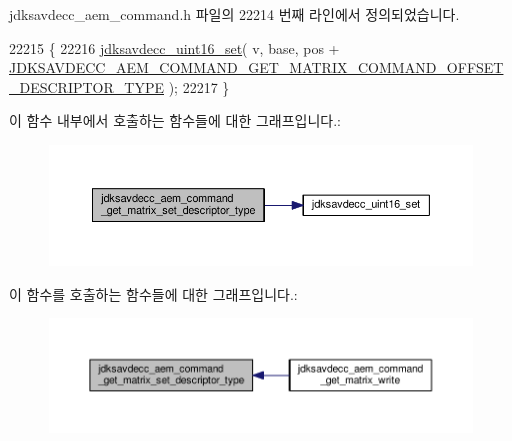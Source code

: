 jdksavdecc\+\_\+aem\+\_\+command.\+h 파일의 22214 번째 라인에서 정의되었습니다.


\begin{DoxyCode}
22215 \{
22216     \hyperlink{group__endian_ga14b9eeadc05f94334096c127c955a60b}{jdksavdecc\_uint16\_set}( v, base, pos + 
      \hyperlink{group__command__get__matrix_ga35cb9cda25238f6143b6fea0d8f0d553}{JDKSAVDECC\_AEM\_COMMAND\_GET\_MATRIX\_COMMAND\_OFFSET\_DESCRIPTOR\_TYPE}
       );
22217 \}
\end{DoxyCode}


이 함수 내부에서 호출하는 함수들에 대한 그래프입니다.\+:
\nopagebreak
\begin{figure}[H]
\begin{center}
\leavevmode
\includegraphics[width=350pt]{group__command__get__matrix_ga3586ff90411e0e3c6e8153e59ae312c8_cgraph}
\end{center}
\end{figure}




이 함수를 호출하는 함수들에 대한 그래프입니다.\+:
\nopagebreak
\begin{figure}[H]
\begin{center}
\leavevmode
\includegraphics[width=350pt]{group__command__get__matrix_ga3586ff90411e0e3c6e8153e59ae312c8_icgraph}
\end{center}
\end{figure}


